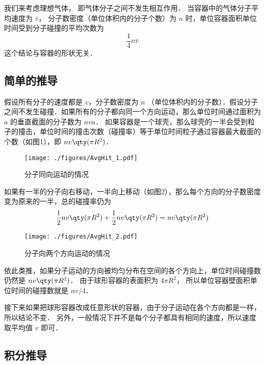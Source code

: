 
\begin{issues}
\issueTODO
\end{issues}


我们来考虑理想气体， 即气体分子之间不发生相互作用． 当容器中的气体分子平均速度为 $\bar v$， 分子数密度（单位体积内的分子个数）为 $n$ 时，单位容器面积单位时间受到分子碰撞的平均次数为
\begin{equation}
\frac14 n\bar v
\end{equation}
这个结论与容器的形状无关．

\subsection{简单的推导}

假设所有分子的速度都是 $v$，分子数密度为 $n$ （单位体积内的分子数）．假设分子之间不发生碰撞．如果所有的分子都向同一个方向运动，那么单位时间通过面积为 $a$ 的垂直截面的分子数为 $nva$． 如果容器是一个球壳，那么球壳的一半会受到粒子的撞击，单位时间的撞击次数（碰撞率）等于单位时间粒子通过容器最大截面的个数（如图1），即 $nv \qty(\pi R^2)$． 
\begin{figure}[ht]
\centering
\texttt{[image: ./figures/AvgHit\_1.pdf]}
\caption{分子同向运动的情况} \label{AvgHit_fig1}
\end{figure}
如果有一半的分子向右移动，一半向上移动（如图2），那么每个方向的分子数密度变为原来的一半，总的碰撞率仍为
\begin{equation}
\frac12 nv \qty(\pi R^2) + \frac12 nv \qty(\pi R^2) = nv \qty(\pi R^2)
\end{equation}

\begin{figure}[ht]
\centering
\texttt{[image: ./figures/AvgHit\_2.pdf]}
\caption{分子向两个方向运动的情况} \label{AvgHit_fig2}
\end{figure}
依此类推，如果分子运动的方向被均匀分布在空间的各个方向上，单位时间碰撞数仍然是 $nv \qty(\pi R^2)$．
由于球形容器的表面积为 $4\pi R^2$， 所以单位容器壁面积单位时间的碰撞数就是 $nv/4$． 

接下来如果把球形容器改成任意形状的容器，由于分子运动在各个方向都是一样，所以结论不变． 另外，一般情况下并不是每个分子都具有相同的速度，所以速度取平均值 $v$ 即可．

\subsection{积分推导}
